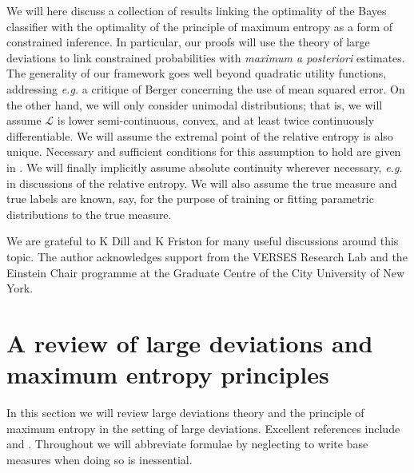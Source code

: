 \documentclass[11pt]{amsart}
\numberwithin{equation}{section}
\theoremstyle{remark}
\theoremstyle{remark}
\newcommand{\lag}{\mathcal{L}}
\begin{document}
We will here discuss a collection of results linking the optimality of the Bayes classifier with the optimality of the principle of maximum entropy as a form of constrained inference. In particular, our proofs will use the theory of large deviations to link constrained probabilities with {\it maximum a posteriori} estimates. The generality of our framework goes well beyond quadratic utility functions, addressing {\it e.g.} a critique of Berger concerning the use of mean squared error. On the other hand, we will only consider unimodal distributions; that is, we will assume $\lag$ is lower semi-continuous, convex, and at least twice continuously differentiable. We will assume the extremal point of the relative entropy is also unique. Necessary and sufficient conditions for this assumption to hold are given in \cite{csiszar}. We will finally implicitly assume absolute continuity wherever necessary, {\it e.g.} in discussions of the relative entropy. We will also assume the true measure and true labels are known, say, for the purpose of training or fitting parametric distributions to the true measure.

We are grateful to K Dill and K Friston for many useful discussions around this topic. The author acknowledges support from the VERSES Research Lab and the Einstein Chair programme at the Graduate Centre of the City University of New York.


\section{A review of large deviations and maximum entropy principles}\label{review-sec}

In this section we will review large deviations theory and the principle of maximum entropy in the setting of large deviations. Excellent references include \cite{dembo2009large, varadhan2016large} and \cite[\S 24]{kallenberg1997foundations}. Throughout we will abbreviate formulae by neglecting to write base measures when doing so is inessential. 
\end{document}
